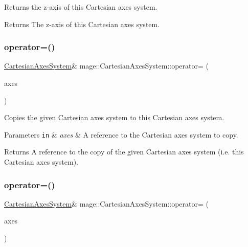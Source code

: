 Returns the z-\/axis of this Cartesian axes system.

\begin{DoxyReturn}{Returns}
The z-\/axis of this Cartesian axes system. 
\end{DoxyReturn}
\hypertarget{structmage_1_1_cartesian_axes_system_af52da9fbab85fc87921eff0ef6a17fe4}{}\label{structmage_1_1_cartesian_axes_system_af52da9fbab85fc87921eff0ef6a17fe4} 
\subsubsection{\texorpdfstring{operator=()}{operator=()}\hspace{0.1cm}{\footnotesize\ttfamily [1/2]}}
{\footnotesize\ttfamily \hyperlink{structmage_1_1_cartesian_axes_system}{Cartesian\+Axes\+System}\& mage\+::\+Cartesian\+Axes\+System\+::operator= (\begin{DoxyParamCaption}\item[{const \hyperlink{structmage_1_1_cartesian_axes_system}{Cartesian\+Axes\+System} \&}]{axes }\end{DoxyParamCaption})\hspace{0.3cm}{\ttfamily [default]}}

Copies the given Cartesian axes system to this Cartesian axes system.


\begin{DoxyParams}[1]{Parameters}
\mbox{\tt in}  & {\em axes} & A reference to the Cartesian axes system to copy. \\
\hline
\end{DoxyParams}
\begin{DoxyReturn}{Returns}
A reference to the copy of the given Cartesian axes system (i.\+e. this Cartesian axes system). 
\end{DoxyReturn}
\hypertarget{structmage_1_1_cartesian_axes_system_ad35384f10ad5a84787ef0cc5507955e9}{}\label{structmage_1_1_cartesian_axes_system_ad35384f10ad5a84787ef0cc5507955e9} 
\subsubsection{\texorpdfstring{operator=()}{operator=()}\hspace{0.1cm}{\footnotesize\ttfamily [2/2]}}
{\footnotesize\ttfamily \hyperlink{structmage_1_1_cartesian_axes_system}{Cartesian\+Axes\+System}\& mage\+::\+Cartesian\+Axes\+System\+::operator= (\begin{DoxyParamCaption}\item[{\hyperlink{structmage_1_1_cartesian_axes_system}{Cartesian\+Axes\+System} \&\&}]{axes }\end{DoxyParamCaption})\hspace{0.3cm}{\ttfamily [default]}}

